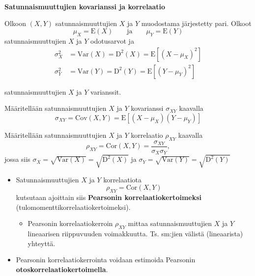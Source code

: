 \documentclass[
]{book}
\providecommand{\tightlist}{%
  \setlength{\itemsep}{0pt}\setlength{\parskip}{0pt}}
\begin{document}
\begin{defblock}{}
\textbf{Satunnaismuuttujien kovarianssi ja korrelaatio}

Olkoon \((X, Y)\) satunnaismuuttujien \(X\) ja \(Y\) muodostama järjestetty pari. Olkoot
\[
\mu_X = \text{E}(X) \qquad \mathrm{ja} \qquad  \mu_Y = \text{E}(Y)
\]
satunnaismuuttujien \(X\) ja \(Y\) odotusarvot ja
\begin{align*}
\sigma^2_X &= \mathrm{Var}(X) = \text{D}^2(X) = \text{E}[(X - \mu_X)^2] \\
\sigma^2_Y &= \mathrm{Var}(Y) = \text{D}^2(Y) = \text{E}[(Y - \mu_Y)^2]
\end{align*}

satunnaismuuttujien \(X\) ja \(Y\) varianssit.

\hfill\break

Määritellään satunnaismuuttujien \(X\) ja \(Y\) kovarianssi \(\sigma_{XY}\) kaavalla
\[
\sigma_{XY} = \mathrm{Cov}(X,Y) = \text{E}[(X-\mu_X)(Y-\mu_Y)]
\]

Määritellään satunnaismuuttujien \(X\) ja \(Y\) korrelaatio \(\rho_{XY}\) kaavalla
\[
\rho_{XY} = \mathrm{Cor}(X,Y) = \frac{\sigma_{XY}}{\sigma_{X} \sigma_{Y}},
\]
jossa siis \(\sigma_X = \sqrt{\mathrm{Var}(X)} = \sqrt{\text{D}^2(X)}\) ja \(\sigma_Y = \sqrt{\mathrm{Var}(Y)} = \sqrt{\text{D}^2(Y)}\)

\end{defblock}

\begin{itemize}
\tightlist
\item
  Satunnaismuuttujien \(X\) ja \(Y\) korrelaatiota
  \[
  \rho_{XY} = \mathrm{Cor}(X, Y)
  \]
  kutsutaan ajoittain siis \textbf{Pearsonin korrelaatiokertoimeksi} (tulomomenttikorrelaatiokertoimeksi).

  \begin{itemize}
  \tightlist
  \item
    Pearsonin korrelaatiokerroin \(\rho_{XY}\) mittaa satunnaismuuttujien \(X\) ja \(Y\) lineaarisen riippuvuuden voimakkuutta. Ts. sm:jien välistä (lineaarista) yhteyttä.
  \end{itemize}
\item
  Pearsonin korrelaatiokerrointa voidaan estimoida Pearsonin \textbf{otoskorrelaatiokertoimella}.
\end{itemize}
\end{document}
